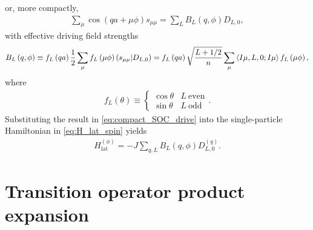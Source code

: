 \documentclass[nofootinbib,notitlepage,11pt]{revtex4-2}
\renewcommand{\t}{\text} %
\newcommand{\f}[2]{\dfrac{#1}{#2}} %
\newcommand{\p}[1]{\left(#1\right)} %
\newcommand{\bk}{\Braket} %
\newcommand{\1}{\mathds{1}}
\def\obk#1{\mathinner{({#1})}}
\begin{document}
or, more compactly,
\begin{align}
  \sum_\mu \cos\p{qa+\mu\phi} s_{\mu\mu}
  = \sum_L B_L\p{q,\phi} D_{L,0},
  \label{eq:compact_SOC_drive}
\end{align}
with effective driving field strengths
\begin{align}
  B_L\p{q,\phi}
  \equiv f_L\p{qa} \f12
  \sum_\mu f_L\p{\mu\phi} \obk{s_{\mu\mu}|D_{L,0}}
  = f_L\p{qa} \sqrt{\f{L+1/2}{n}}
  \sum_\mu \bk{I\mu,L,0;I\mu} f_L\p{\mu\phi},
\end{align}
where
\begin{align}
  f_L\p{\theta} \equiv
  \begin{cases}
    \cos\theta & L~\t{even} \\
    \sin\theta & L~\t{odd}
  \end{cases}.
\end{align}
Substituting the result in \eqref{eq:compact_SOC_drive} into the
single-particle Hamiltonian in \eqref{eq:H_lat_spin} yields
\begin{align}
  H_{\t{lat}}^{(\phi)} = -J \sum_{q,L} B_L\p{q,\phi} D_{L,0}^{(q)}.
\end{align}

\section{Transition operator product expansion}
\label{sec:trans_prod}
\end{document}

